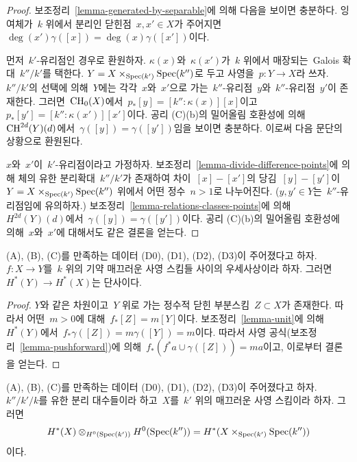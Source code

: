 \begin{proof}
보조정리\  \ref{lemma-generated-by-separable}에 의해 다음을 보이면
충분하다. 잉여체가\  $k$ 위에서 분리인 닫힌점\  $x, x' \in X$가
주어지면\ 
$\deg(x') \gamma([x]) = \deg(x) \gamma([x'])$이다.

\medskip\noindent
먼저\  $k'$-유리점인 경우로 환원하자. $\kappa(x)$와\  $\kappa(x')$가\ 
$k$ 위에서 매장되는\  Galois 확대\  $k''/k'$를 택한다.
$Y = X \times_{\mathop{\mathrm{Spec}}(k')} \mathop{\mathrm{Spec}}(k'')$로 두고 사영을\  $p : Y \to X$라
쓰자. $k''/k'$의 선택에 의해\  $Y$에는 각각\ $x$와\ $x'$으로 가는\ 
$k''$-유리점\  $y$와\  $k''$-유리점\  $y'$이 존재한다. 그러면\  $\mathop{\mathrm{CH}}\nolimits_0(X)$에서\ 
$p_*[y] = [k'' : \kappa(x)][x]$이고\ 
$p_*[y'] = [k'' : \kappa(x')][x']$이다. 공리 (C)(b)의 밀어올림
호환성에 의해\  $\mathop{\mathrm{CH}}\nolimits^{2d}(Y)(d)$에서\ 
$\gamma([y]) = \gamma([y'])$임을 보이면 충분하다. 이로써 다음
문단의 상황으로 환원된다.

\medskip\noindent
$x$와\  $x'$이\  $k'$-유리점이라고 가정하자. 보조정리\ 
\ref{lemma-divide-difference-points}에 의해 체의 유한 분리확대\ 
$k''/k'$가 존재하여 차이\  $[x] - [x']$의 당김\  $[y] - [y']$이\ 
$Y = X \times_{\mathop{\mathrm{Spec}}(k')} \mathop{\mathrm{Spec}}(k'')$ 위에서 어떤 정수\  $n > 1$로
나누어진다. ($y, y' \in Y$는\  $k''$-유리점임에 유의하자.)
보조정리\  \ref{lemma-relations-classes-points}에 의해\ 
$H^{2d}(Y)(d)$에서\  $\gamma([y]) = \gamma([y'])$이다. 공리 (C)(b)의
밀어올림 호환성에 의해\  $x$와\  $x'$에 대해서도 같은 결론을 얻는다.
\end{proof}
\begin{lemma}
\label{lemma-injective}
(A), (B), (C)를 만족하는 데이터 (D0), (D1), (D2), (D3)이
주어졌다고 하자. $f : X \to Y$를\  $k$ 위의 기약 매끄러운 사영 스킴들
사이의 우세사상이라 하자. 그러면\  $H^*(Y) \to H^*(X)$는 단사이다.
\end{lemma}

\begin{proof}
$Y$와 같은 차원이고\  $Y$ 위로 가는 정수적 닫힌 부분스킴\ 
$Z \subset X$가 존재한다. 따라서 어떤\  $m > 0$에 대해\ 
$f_*[Z] = m[Y]$이다. 보조정리\  \ref{lemma-unit}에 의해\ 
$H^*(Y)$에서\  $f_* \gamma([Z]) = m \gamma([Y]) = m$이다. 따라서
사영 공식(보조정리\  \ref{lemma-pushforward})에 의해\ 
$f_*(f^*a \cup \gamma([Z])) = m a$이고, 이로부터 결론을 얻는다.
\end{proof}

\begin{lemma}
\label{lemma-otimes}
(A), (B), (C)를 만족하는 데이터 (D0), (D1), (D2), (D3)이
주어졌다고 하자. $k''/k'/k$를 유한 분리 대수들이라 하고\  $X$를\ 
$k'$ 위의 매끄러운 사영 스킴이라 하자. 그러면
$$
H^*(X) \otimes_{H^0(\mathop{\mathrm{Spec}}(k'))} H^0(\mathop{\mathrm{Spec}}(k'')) =
H^*(X \times_{\mathop{\mathrm{Spec}}(k')} \mathop{\mathrm{Spec}}(k''))
$$
이다.
\end{lemma}

